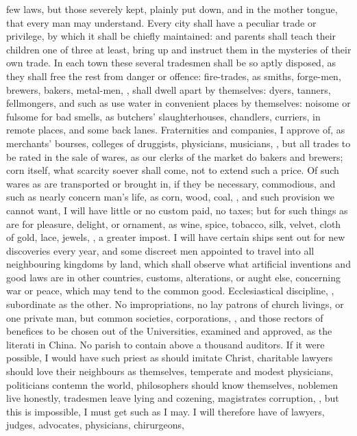 few laws, but those severely kept, plainly put down, and in the mother tongue,
that every man may understand. Every city shall have a peculiar trade or
privilege, by which it shall be chiefly maintained: and
parents shall teach their children one of three at least, bring up and instruct
them in the mysteries of their own trade. In each town these several tradesmen
shall be so aptly disposed, as they shall free the rest from danger or offence:
fire-trades, as smiths, forge-men, brewers, bakers, metal-men, \etc{}, shall
dwell apart by themselves: dyers, tanners, fellmongers, and such as use water
in convenient places by themselves: noisome or fulsome for bad smells, as
butchers' slaughterhouses, chandlers, curriers, in remote places, and some back
lanes. Fraternities and companies, I approve of, as merchants' bourses,
colleges of druggists, physicians, musicians, \etc{}, but all trades to be
rated in the sale of wares, as our clerks of the market do bakers and brewers;
corn itself, what scarcity soever shall come, not to extend such a price. Of
such wares as are transported or brought in, if they be
necessary, commodious, and such as nearly concern man's life, as corn, wood,
coal, \etc{}, and such provision we cannot want, I will have little or no
custom paid, no taxes; but for such things as are for pleasure, delight, or
ornament, as wine, spice, tobacco, silk, velvet, cloth of gold, lace, jewels,
\etc{}, a greater impost. I will have certain ships sent out for new
discoveries every year, and some discreet men appointed to
travel into all neighbouring kingdoms by land, which shall observe what
artificial inventions and good laws are in other countries, customs,
alterations, or aught else, concerning war or peace, which may tend to the
common good. Ecclesiastical discipline, , subordinate as
the other. No impropriations, no lay patrons of church livings, or one private
man, but common societies, corporations, \etc{}, and those rectors of benefices
to be chosen out of the Universities, examined and approved, as the literati in
China. No parish to contain above a thousand auditors. If it were possible, I
would have such priest as should imitate Christ, charitable lawyers should love
their neighbours as themselves, temperate and modest physicians, politicians
contemn the world, philosophers should know themselves, noblemen live honestly,
tradesmen leave lying and cozening, magistrates corruption, \etc{}, but this is
impossible, I must get such as I may. I will therefore have
of lawyers, judges, advocates, physicians, chirurgeons,

